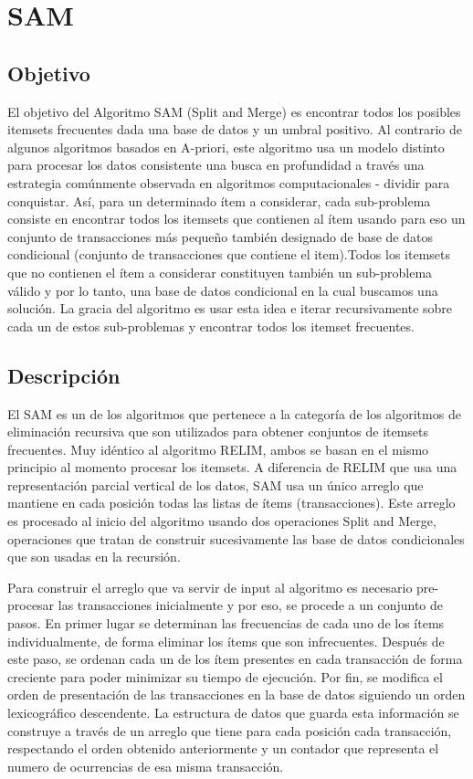 \documentclass[12pt,spanish]{article}
\begin{document}
\section{SAM}
\subsection{Objetivo}
El objetivo del Algoritmo SAM (Split and Merge)  es encontrar todos los posibles itemsets frecuentes dada una base de datos y un umbral positivo. Al contrario de algunos algoritmos basados en A-priori, este algoritmo usa un modelo distinto para procesar los datos consistente una busca en profundidad a través una estrategia comúnmente observada en algoritmos computacionales - dividir para conquistar. Así, para un determinado ítem a considerar, cada sub-problema consiste en encontrar todos los itemsets que contienen al ítem usando para eso un conjunto de transacciones  más pequeño también designado de base de datos condicional (conjunto de transacciones que contiene el item).Todos los itemsets que no contienen el ítem a considerar constituyen también un sub-problema válido y por lo tanto, una base de datos condicional en la cual buscamos una solución. La gracia del algoritmo es usar esta idea e iterar recursivamente sobre cada un de estos sub-problemas y encontrar todos los itemset frecuentes.

\subsection{Descripci\'on}
El SAM es un de los algoritmos que pertenece a la categoría de los algoritmos de eliminación recursiva que son utilizados para obtener conjuntos de itemsets frecuentes. Muy idéntico al algoritmo RELIM,  ambos se basan en el mismo principio al momento procesar los itemsets. A diferencia de RELIM que usa una representación parcial vertical de los datos, SAM usa un único arreglo que mantiene en cada posición todas las listas de ítems (transacciones). Este arreglo es procesado al inicio del algoritmo usando dos operaciones Split and Merge, operaciones que tratan de construir sucesivamente las base de datos condicionales que son usadas en la recursión.

Para construir el arreglo que va servir de input al algoritmo es necesario pre-procesar las transacciones inicialmente y por eso, se procede a un conjunto de pasos. En primer lugar se determinan las frecuencias de cada uno de los ítems individualmente, de forma eliminar los ítems que son infrecuentes. Después de este paso, se ordenan cada un de los ítem presentes en cada transacción de forma creciente para poder minimizar su tiempo de ejecución. Por fin, se  modifica el orden de presentación de las transacciones en la base de datos siguiendo un orden lexicográfico descendente. La estructura de datos que guarda esta información se construye a través de un arreglo que tiene para cada posición cada transacción, respectando el orden obtenido anteriormente y un contador que representa el numero de ocurrencias de esa misma transacción.
\end{document}
